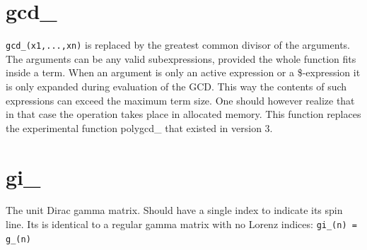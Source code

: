 
\section{gcd\_}
\label{fungcd}
\noindent \verb:gcd_(x1,...,xn): is replaced by the greatest common divisor 
of the arguments. The arguments can be any valid subexpressions, provided 
the whole function fits inside a term. When an argument is only an active 
expression or a \$-expression it is only expanded during evaluation of the 
GCD\@. This way the contents of such expressions can exceed the maximum term 
size. One should however realize that in that case the operation takes 
place in allocated memory.
This function replaces the experimental function 
polygcd\_ that existed in 
version 3.


\section{gi\_}
\label{fungi}
\noindent The unit Dirac gamma matrix. Should have a single index 
to indicate its spin line. Its is identical to a regular gamma matrix with 
no Lorenz indices: \verb:gi_(n) = g_(n):


